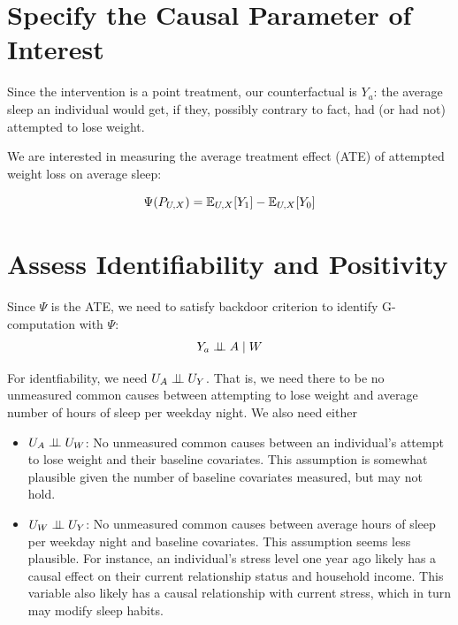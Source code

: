 \documentclass{article}
\begin{document}
\section{Specify the Causal Parameter of Interest}

Since the intervention is a point treatment, our counterfactual is $Y_{a}$: the average sleep an individual would get, if they, possibly contrary to fact, had (or had not) attempted to lose weight.

We are interested in measuring the average treatment effect (ATE) of attempted weight loss on average sleep:

$$\Psi(P_{U,X}) = \mathbb{E}_{U,X}[Y_1] - \mathbb{E}_{U,X}[Y_0]$$

\section{Assess Identifiability and Positivity}
\label{sec:assumptions}

Since $\Psi$ is the ATE, we need to satisfy backdoor criterion to identify G-computation with $\Psi$:
   $$Y_{a} \perp\hspace{-5pt}\perp A \mid W$$

For identfiability, we need $U_{A} \perp\hspace{-5pt}\perp U_{Y}$. That is, we need there to be no unmeasured common causes between attempting to lose weight and average number of hours of sleep per weekday night. We also need either
    \begin{itemize}
      \item $U_{A} \perp\hspace{-5pt}\perp U_{W}$: No unmeasured common causes between an individual's attempt to lose weight and their baseline covariates. This assumption is somewhat plausible given the number of baseline covariates measured, but may not hold.
      \item $U_{W} \perp\hspace{-5pt}\perp U_{Y}$: No unmeasured common causes between average hours of sleep per weekday night and baseline covariates. This assumption seems less plausible. For instance, an individual's stress level one year ago likely has a causal effect on their current relationship status and household income. This variable also likely has a causal relationship with current stress, which in turn may modify sleep habits.
    \end{itemize}
\end{document}
